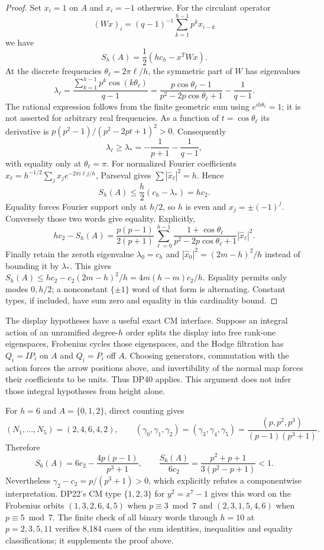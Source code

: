 \documentclass[11pt,a4paper]{article}
\theoremstyle{definition}\newtheorem{remark}[theorem]{Remark}
\begin{document}
\begin{proof}
Set $x_i=1$ on $A$ and $x_i=-1$ otherwise. For the circulant operator
\[
 (Wx)_i=(q-1)^{-1}\sum_{k=1}^{h-1}p^kx_{i-k}
\]
we have
\[
 S_h(A)=\frac12(hc_h-x^TWx).
\]
At the discrete frequencies $\theta_\ell=2\pi\ell/h$, the symmetric part of $W$ has eigenvalues
\[
 \lambda_\ell=\frac{\sum_{k=1}^{h-1}p^k\cos(k\theta_\ell)}{q-1}
 =\frac{p\cos\theta_\ell-1}{p^2-2p\cos\theta_\ell+1}
       -\frac1{q-1}.
\]
The rational expression follows from the finite geometric sum using
$e^{ih\theta_\ell}=1$; it is not asserted for arbitrary real frequencies.
As a function of $t=\cos\theta_\ell$ its derivative is
$p(p^2-1)/(p^2-2pt+1)^2>0$. Consequently
\[
 \lambda_\ell\ge\lambda_*=-\frac1{p+1}-\frac1{q-1},
\]
with equality only at $\theta_\ell=\pi$. For normalized Fourier coefficients
$\widehat x_\ell=h^{-1/2}\sum_jx_je^{-2\pi i\ell j/h}$, Parseval gives
$\sum|\widehat x_\ell|^2=h$. Hence
\[
 S_h(A)\le\frac h2(c_h-\lambda_*)=hc_2.
\]
Equality forces Fourier support only at $h/2$, so $h$ is even and
$x_j=\pm(-1)^j$. Conversely those two words give equality. Explicitly,
\[
 hc_2-S_h(A)=\frac{p(p-1)}{2(p+1)}
 \sum_{\ell=0}^{h-1}
 \frac{1+\cos\theta_\ell}{p^2-2p\cos\theta_\ell+1}
 |\widehat x_\ell|^2.
\]
Finally retain the zeroth eigenvalue $\lambda_0=c_h$ and
$|\widehat x_0|^2=(2m-h)^2/h$ instead of bounding it by $\lambda_*$. This gives
$S_h(A)\le hc_2-c_2(2m-h)^2/h=4m(h-m)c_2/h$.
Equality permits only modes $0,h/2$; a nonconstant $\{\pm1\}$ word of that form is alternating. Constant types, if included, have sum zero and equality in this cardinality bound.
\end{proof}

The display hypotheses have a useful exact CM interface. Suppose an integral action of an unramified degree-$h$ order splits the display into free rank-one eigenspaces, Frobenius cycles those eigenspaces, and the Hodge filtration has $Q_i=IP_i$ on $A$ and $Q_i=P_i$ off $A$. Choosing generators, commutation with the action forces the arrow positions above, and invertibility of the normal map forces their coefficients to be units. Thus DP40 applies. This argument does not infer those integral hypotheses from height alone.

For $h=6$ and $A=\{0,1,2\}$, direct counting gives
\[
 (N_1,\ldots,N_5)=(2,4,6,4,2),\qquad
 (\gamma_0,\gamma_1,\gamma_2)
 =(\gamma_3,\gamma_4,\gamma_5)
 =\frac{(p,p^2,p^3)}{(p-1)(p^3+1)}.
\]
Therefore
\[
 S_6(A)=6c_2-\frac{4p(p-1)}{p^3+1},\qquad
 \frac{S_6(A)}{6c_2}=\frac{p^2+p+1}{3(p^2-p+1)}<1.
\]
Nevertheless $\gamma_2-c_2=p/(p^3+1)>0$, which explicitly refutes a componentwise interpretation. DP22's CM type $\{1,2,3\}$ for $y^2=x^7-1$ gives this word on the Frobenius orbits
$(1,3,2,6,4,5)$ when $p\equiv3\bmod7$ and
$(2,3,1,5,4,6)$ when $p\equiv5\bmod7$.
The finite check of all binary words through $h=10$ at $p=2,3,5,11$ verifies 8,184 cases of the sum identities, inequalities and equality classifications; it supplements the proof above.
\end{document}
